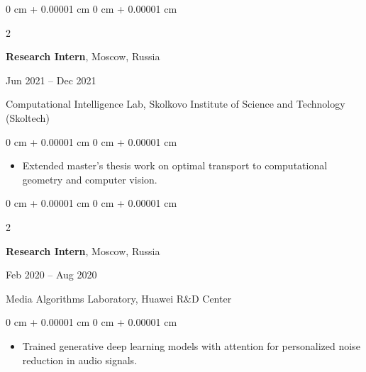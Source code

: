 \documentclass[10pt, letterpaper]{article}
\newenvironment{highlights}{
    \begin{itemize}[
        topsep=0.10 cm,
        parsep=0.10 cm,
        partopsep=0pt,
        itemsep=0pt,
        leftmargin=0 cm + 10pt
    ]
}{
    \end{itemize}
} %
\newenvironment{onecolentry}{
    \begin{adjustwidth}{
        0 cm + 0.00001 cm
    }{
        0 cm + 0.00001 cm
    }
}{
    \end{adjustwidth}
} %
\newenvironment{twocolentry}[2][]{
    \onecolentry
    \def\secondColumn{#2}
    \setcolumnwidth{\fill, 4.5 cm}
    \begin{paracol}{2}
}{
    \switchcolumn \raggedleft \secondColumn
    \end{paracol}
    \endonecolentry
} %
\begin{document}
        \vspace{0.1 cm}

        \begin{twocolentry}{Jun 2021 -- Dec 2021}
            \textbf{Research Intern}, Moscow, Russia
        \end{twocolentry}
        Computational Intelligence Lab, Skolkovo Institute of Science and Technology (Skoltech)
        \vspace{0.01 cm}
        \begin{onecolentry}
            \begin{highlights}
                \item Extended master's thesis work on optimal transport to computational geometry and computer vision.
            \end{highlights}
        \end{onecolentry}

        \vspace{0.05 cm}

        \begin{twocolentry}{Feb 2020 -- Aug 2020}
            \textbf{Research Intern}, Moscow, Russia
        \end{twocolentry}
        Media Algorithms Laboratory, Huawei R\&D Center
        \vspace{0.01 cm}
        \begin{onecolentry}
            \begin{highlights}
                \item Trained generative deep learning models with attention for personalized noise reduction in audio signals.
            \end{highlights}
        \end{onecolentry}


\end{document}
